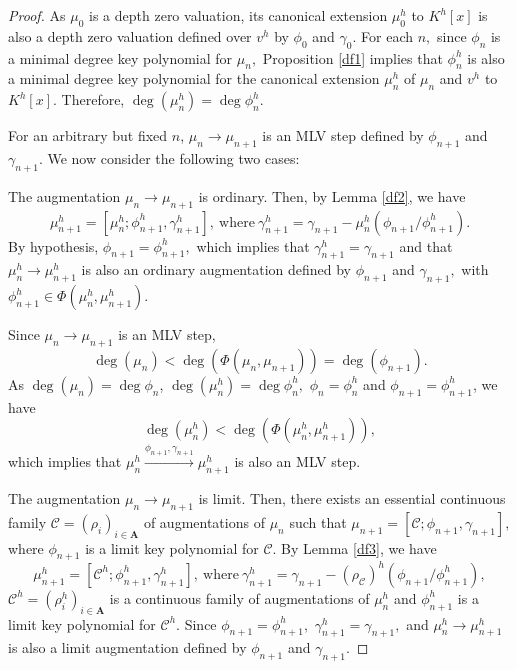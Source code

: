 \documentclass[11pt]{amsart}
\theoremstyle{definition}
\theoremstyle{remark}
\numberwithin{equation}{section}
\begin{document}
 	\begin{proof}
 	  As $\mu_0$ is a depth zero valuation, its canonical extension $\mu_0^h$ to $K^h[x]$ is also a depth zero valuation defined over $v^h$ by $\phi_0$ and $\gamma_0$. For each $n,$ since $\phi_n$ is a minimal degree key polynomial for $\mu_n,$ Proposition \ref{df1} implies that $\phi_n^h$ is also a minimal degree key polynomial for the canonical extension $\mu_n^h$ of $\mu_n$ and $v^h$ to $K^h[x].$ Therefore, $\deg(\mu_n^h)=\deg\phi_n^h.$
 	  
 	   For an arbitrary but fixed $n$, $\mu_n\longrightarrow \mu_{n+1}$ is an MLV step defined by $\phi_{n+1}$ and $\gamma_{n+1}.$ We now consider the following two cases:
 	   
 	  \smallskip
 		 The augmentation $\mu_n\longrightarrow \mu_{n+1}$ is ordinary. Then, by Lemma \ref{df2}, we have \[\mu_{n+1}^h=[\mu_n^h;\phi_{n+1}^h,\gamma_{n+1}^h],\ \text{where}\ \gamma_{n+1}^h=\gamma_{n+1}-\mu_n^h(\phi_{n+1}/\phi_{n+1}^h).\] By hypothesis, $\phi_{n+1}=\phi_{n+1}^h,$ which implies that $\gamma_{n+1}^h=\gamma_{n+1}$ and that $\mu_n^h\longrightarrow \mu_{n+1}^h$ is also an ordinary augmentation defined by $\phi_{n+1}$ and $\gamma_{n+1},$ with $\phi_{n+1}^h\in \Phi(\mu_n^h,\mu_{n+1}^h).$ 
 		
 		Since $\mu_n\longrightarrow \mu_{n+1}$ is an MLV step, \[\deg(\mu_n)<\deg(\Phi(\mu_n,\mu_{n+1}))=\deg(\phi_{n+1}).\] As $\deg(\mu_n)=\deg\phi_n$,  $\deg(\mu_n^h)=\deg\phi_n^h,$ $\phi_n=\phi_n^h$ and $\phi_{n+1}=\phi_{n+1}^h$, we have \[\deg(\mu_n^h)<\deg(\Phi(\mu_n^h,\mu_{n+1}^h)),\] which implies that $\mu_n^h\xrightarrow{\phi_{n+1},\gamma_{n+1}} \mu_{n+1}^h$ is also an MLV step.
 		
 		\smallskip
 		  The augmentation $\mu_n\longrightarrow \mu_{n+1}$ is limit. Then, there exists an essential continuous family $\mathcal{C}  =(\rho_i)_{i\in\mathbf{A}}$ of augmentations of $\mu_n$ such that $\mu_{n+1}=[\mathcal{C}; \phi_{n+1},\gamma_{n+1}],$ where $\phi_{n+1}$ is a limit key polynomial for $\mathcal{C}.$ By Lemma \ref{df3}, we have \[\mu_{n+1}^h=[\mathcal{C}^h; \phi_{n+1}^h,\gamma_{n+1}^h],\ \text{where}\ \gamma_{n+1}^h=\gamma_{n+1}-(\rho_{\mathcal{C}})^h(\phi_{n+1}/\phi_{n+1}^h),\] $\mathcal{C}^h=(\rho_i^h)_{i\in \mathbf{A}}$ is a continuous family of augmentations of $\mu_n^h$ and $\phi_{n+1}^h$ is a limit key polynomial for $\mathcal{C}^h.$ Since $\phi_{n+1}=\phi_{n+1}^h,$ $\gamma_{n+1}^h=\gamma_{n+1},$ and $\mu_n^h\longrightarrow \mu_{n+1}^h$ is also a limit augmentation defined by $\phi_{n+1}$ and $\gamma_{n+1}.$
 		

\end{proof}
\end{document}
